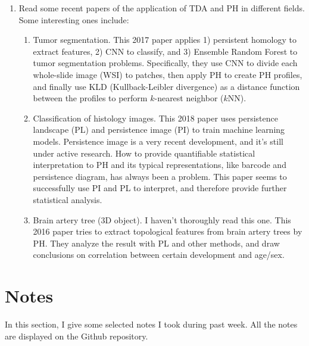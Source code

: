 \documentclass[10pt,a4paper]{article}
\begin{document}
\begin{enumerate}
	\item Read some recent papers of the application of TDA and PH in different fields. Some interesting ones include:
	\begin{enumerate}
		\item Tumor segmentation. This 2017 paper \cite{Qaiser2017} applies 1) persistent homology to extract features, 2) CNN to classify, and 3) Ensemble Random Forest to tumor segmentation problems. Specifically, they use CNN to divide each whole-slide image (WSI) to patches, then apply PH to create PH profiles, and finally use KLD (Kullback-Leibler divergence) as a distance function between the profiles to perform $k$-nearest neighbor ($k$NN).
		\item Classification of histology images. This 2018 paper \cite{Chittajallu2018} uses persistence landscape (PL) and persistence image (PI) to train machine learning models. Persistence image is a very recent development, and it's still under active research. How to provide quantifiable statistical interpretation to PH and its typical representations, like barcode and persistence diagram, has always been a problem. This paper seems to successfully use PI and PL to interpret, and therefore provide further statistical analysis.
		\item Brain artery tree (3D object). I haven't thoroughly read this one. This 2016 paper \cite{Bendich2016} tries to extract topological features from brain artery trees by PH. They analyze the result with PL and other methods, and draw conclusions on correlation between certain development and age/sex.
	\end{enumerate}
\end{enumerate}

\section{Notes}
In this section, I give some selected notes I took during past week. All the notes are displayed on the Github repository.
\end{document}

